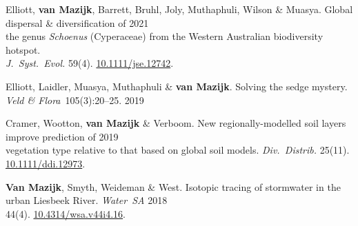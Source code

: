 Elliott, \textbf{van Mazijk}, Barrett, Bruhl,
Joly, Muthaphuli, Wilson \& Muasya.
Global dispersal \& diversification of                            \hfill 2021 \\
\hspace{2em}
  the genus \textit{Schoenus} (Cyperaceae)
  from the Western Australian biodiversity hotspot.                           \\
\hspace{2em}
  \textit{J.~Syst.~Evol.}
  59(4).
  \href{https://doi.org/10.1111/jse.1274}{10.1111/jse.12742}.

Elliott, Laidler, Muasya, Muthaphuli \& \textbf{van Mazijk}.
Solving the sedge mystery.
\textit{Veld \& Flora}~105(3):20--25.                             \hfill 2019

Cramer, Wootton, \textbf{van Mazijk} \& Verboom.
New regionally-modelled soil layers improve prediction of         \hfill 2019 \\
\hspace{2em}
  vegetation type relative to that based on global soil models.
  \textit{Div.~Distrib.}
  25(11).                                                        
  \href{https://doi.org/10.1111/ddi.12973}{10.1111/ddi.12973}.

\textbf{Van Mazijk}, Smyth, Weideman \& West.
Isotopic tracing of stormwater in the urban Liesbeek River.
\textit{Water~SA}                                                 \hfill 2018 \\
\hspace{2em}
  44(4).
  \href{https://doi.org/10.4314/wsa.v44i4.16}{10.4314/wsa.v44i4.16}.
